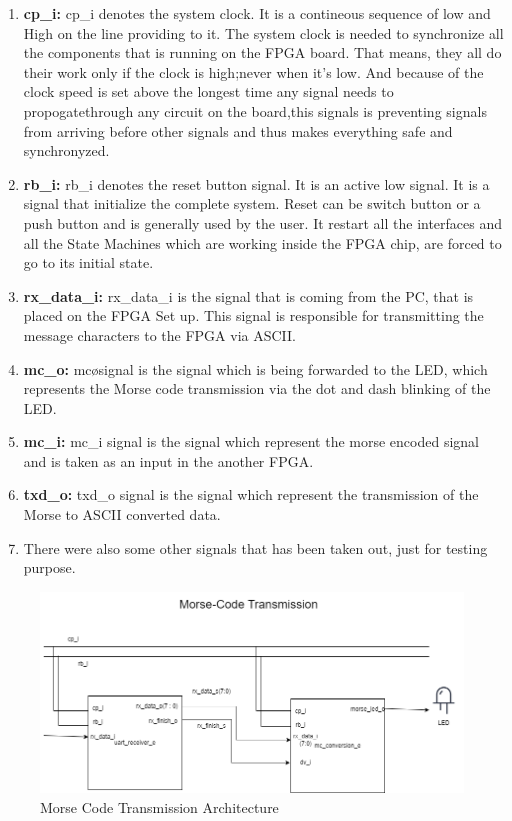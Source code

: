 \documentclass[12pt,a4paper]{article}
\begin{document}
\begin{enumerate}
\item \textbf{cp\_i:} cp\_i denotes the system clock. It is a contineous sequence of low and High on the line providing to it. The system clock is needed to synchronize all the components that is running on the FPGA board. That means, they all do their work only if the clock is high;never when it’s low. And because of the clock speed is set above the longest time any signal needs to propogatethrough any circuit on the board,this signals is preventing signals from arriving before other signals and thus makes everything safe and synchronyzed.

\item \textbf{rb\_i:} rb\_i denotes the reset button signal. It is an active low signal. It is a signal that initialize the complete system. Reset can be switch button or a push button and is generally used by the user. It restart all the interfaces and all the State Machines which are working inside the FPGA chip, are forced to go to its initial state. 

\item \textbf{rx\_data\_i:} rx\_data\_i is the signal that is coming from the PC, that is placed on the FPGA Set up. This signal is responsible for transmitting the message characters to the FPGA via ASCII.

\item \textbf{mc\_o:} mc\o signal is the signal which is being forwarded to the LED, which represents the Morse code transmission via the dot and dash blinking of the LED.

\item \textbf{mc\_i:} mc\_i signal is the signal which represent the morse encoded signal and is taken as an input in the another FPGA.

\item \textbf{txd\_o:} txd\_o signal is the signal which represent the transmission of the Morse to ASCII converted data.

\item There were also some other signals that has been taken out, just for testing purpose.
\end{enumerate}

\begin{figure}[H]
\centering
\includegraphics[scale=0.5]{MC_transmission.drawio.png}
\caption{Morse Code Transmission Architecture}
\label{Top Level Architecture}
\end{figure}
\end{document}
